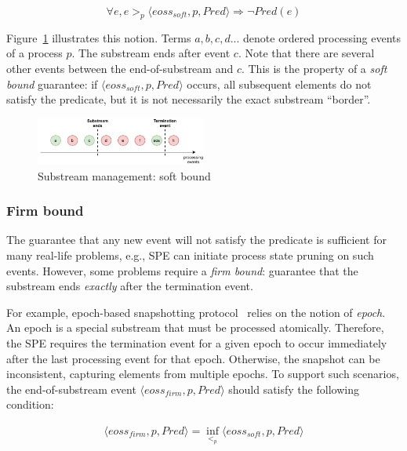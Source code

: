 \begin{equation}
\forall e, e >_p \langle eoss_{soft}, p, Pred\rangle \Rightarrow \neg Pred(e)
\end{equation}

Figure~\ref{general_guarantees} illustrates this notion. Terms $a,b,c,d...$ denote ordered processing events of a process $p$. The substream ends after event $c$. Note that there are several other events between the end-of-substream and $c$. This is the property of a {\em soft bound} guarantee: if $\langle eoss_{soft}, p, Pred\rangle$ occurs, all subsequent elements do not satisfy the predicate, but it is not necessarily the exact substream ``border''.

\begin{figure}[htbp]
  \centering
  \includegraphics[width=0.50\textwidth]{pics/general-guarantee.pdf}
  \caption{Substream management: soft bound}
  \label{general_guarantees}
\end{figure}

\subsubsection{Firm bound}

The guarantee that any new event will not satisfy the predicate is sufficient for many real-life problems, e.g., SPE can initiate process state pruning on such events. However, some problems require a {\em firm bound}: guarantee that the substream ends {\em exactly} after the termination event. 

For example, epoch-based snapshotting protocol~\cite{2015arXiv150608603C, jacques2016consistent} relies on the notion of {\em epoch}. An epoch is a special substream that must be processed atomically. Therefore, the SPE requires the termination event for a given epoch to occur immediately after the last processing event for that epoch. Otherwise, the snapshot can be inconsistent, capturing elements from multiple epochs. To support such scenarios, the end-of-substream event $\langle eoss_{firm}, p, Pred\rangle$ should satisfy the following condition:

\begin{equation}\begin{array}{l}
\langle eoss_{firm}, p, Pred\rangle = \inf_{<_p} \langle eoss_{soft}, p, Pred\rangle
\end{array}\end{equation}

